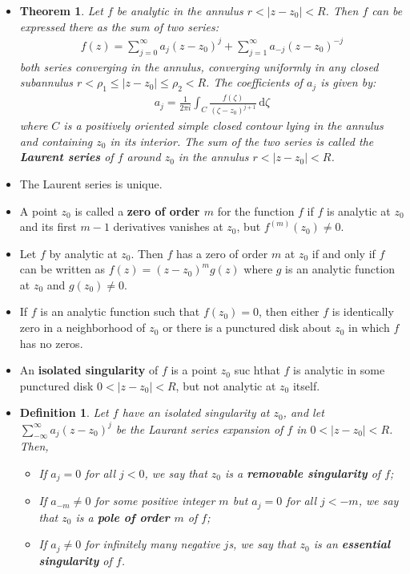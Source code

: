 \documentclass[10pt]{article}
\newtheorem{theorem}[lemma]{Theorem}
\newtheorem{definition}[lemma]{Definition}
\newcommand{\dee}{\mathrm{d}}
\begin{document}
\begin{itemize}
    \item \begin{theorem}
      Let $f$ be analytic in the annulus $r < |z-z_0| < R$. Then $f$ can be expressed there as the sum of two series:
      \begin{align*}
        f(z) = \sum_{j=0}^\infty a_j(z - z_0)^j + \sum_{j=1}^\infty a_{-j}(z-z_0)^{-j}
      \end{align*}
      both series converging in the annulus, converging uniformly in any closed subannulus $r < \rho_1 \leq |z-z_0| \leq \rho_2 < R$. The coefficients of $a_j$ is given by:
      \begin{align*}
        a_j = \frac{1}{2\pi i} \int_{C} \frac{f(\zeta)}{(\zeta - z_0)^{j+1}}\, \dee \zeta
      \end{align*}
      where $C$ is a positively oriented simple closed contour lying in the annulus and containing $z_0$ in its interior.
      The sum of the two series is called the {\bf Laurent series} of $f$ around $z_0$ in the annulus $r < |z - z_0| < R$.
    \end{theorem}

    \item The Laurent series is unique.

    \item A point $z_0$ is called a {\bf zero of order $m$} for the function $f$ if $f$ is analytic at $z_0$ and its first $m-1$ derivatives vanishes at $z_0$, but $f^{(m)}(z_0) \neq 0$.

    \item Let $f$ by analytic at $z_0$. Then $f$ has a zero of order $m$ at $z_0$ if and only if $f$ can be written as $f(z) = (z-z_0)^m g(z)$ where $g$ is an analytic function at $z_0$ and $g(z_0) \neq 0$.

    \item If $f$ is an analytic function such that $f(z_0) = 0$, then either $f$ is identically zero in a neighborhood of $z_0$ or there is a punctured disk about $z_0$ in which $f$ has no zeros.

    \item An {\bf isolated singularity} of $f$ is a point $z_0$ suc hthat $f$ is analytic in some punctured disk $0 < |z-z_0| < R$, but not analytic at $z_0$ itself.

    \item \begin{definition}
      Let $f$ have an isolated singularity at $z_0$, and let $\sum_{-\infty}^\infty a_j (z-z_0)^j$ be the Laurant series expansion of $f$ in $0 < |z-z_0| < R$. Then,
      \begin{itemize}
        \item  If $a_j = 0$ for all $j < 0$, we say that $z_0$ is a {\bf removable singularity} of $f$;
        \item If $a_{-m} \neq 0$ for some positive integer $m$ but $a_j = 0$ for all $j < -m$, we say that $z_0$ is a {\bf pole of order $m$} of $f$;
        \item If $a_j \neq 0$ for infinitely many negative $j$s, we say that $z_0$ is an {\bf essential singularity} of $f$.
      \end{itemize}
    \end{definition}


\end{itemize}
\end{document}
